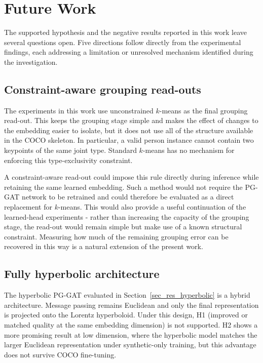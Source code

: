 \section{Future Work}
\label{sec_conc_future}

The supported hypothesis and the negative results reported in this work
leave several questions open.
Five directions follow directly from the experimental findings,
each addressing a limitation or unresolved mechanism identified during
the investigation.

\subsection{Constraint-aware grouping read-outs}
\label{sec_conc_future_constrained}

The experiments in this work use unconstrained $k$-means as the final
grouping read-out.
This keeps the grouping stage simple and makes the effect of changes to
the embedding easier to isolate,
but it does not use all of the structure available in the COCO skeleton.
In particular, a valid person instance cannot contain two keypoints of
the same joint type.
Standard $k$-means has no mechanism for enforcing this type-exclusivity
constraint.

A constraint-aware read-out could impose this rule directly during
inference while retaining the same learned embedding.
Such a method would not require the PG-GAT network to be retrained and
could therefore be evaluated as a direct replacement for $k$-means.
This would also provide a useful continuation of the learned-head
experiments -
rather than increasing the capacity of the grouping stage,
the read-out would remain simple but make use of a known structural
constraint.
Measuring how much of the remaining grouping error can be recovered in
this way is a natural extension of the present work.

\subsection{Fully hyperbolic architecture}
\label{sec_conc_future_hyperbolic}

The hyperbolic PG-GAT evaluated in Section~\ref{sec_res_hyperbolic}
is a hybrid architecture.
Message passing remains Euclidean and only the final representation is
projected onto the Lorentz hyperboloid.
Under this design, H1 (improved or matched quality at the same
embedding dimension) is not supported.
H2 shows a more promising result at low dimension,
where the hyperbolic model matches the larger Euclidean representation
under synthetic-only training,
but this advantage does not survive COCO fine-tuning.

